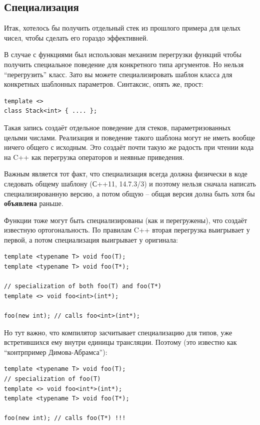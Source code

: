 \documentclass[a4paper,12pt,oneside]{book}
\begin{document}
\subsection{Специализация}\label{TemplateSpec}

Итак, хотелось бы получить отдельный стек из прошлого примера для целых чисел, чтобы сделать его гораздо эффективней.

В случае с функциями был использован механизм перегрузки функций чтобы получить специальное поведение для конкретного типа аргументов. Но нельзя ``перегрузить'' класс. Зато вы можете специализировать шаблон класса для конкретных шаблонных параметров. Синтаксис, опять же, прост:

\begin{lstlisting}
template <>
class Stack<int> { .... };
\end{lstlisting}

Такая запись создаёт отдельное поведение для стеков, параметризованных целыми числами. Реализация и поведение такого шаблона могут не иметь вообще ничего общего с исходным. Это создаёт почти такую же радость при чтении кода на C++ как перегрузка операторов и неявные приведения.

Важным является тот факт, что специализация всегда должна физически в коде следовать общему шаблону (С++11, 14.7.3/3) и поэтому нельзя сначала написать специализированную версию, а потом общую -- общая версия долна быть хотя бы \textbf{объявлена} раньше.

Функции тоже могут быть специализированы (как и перегружены), что создаёт известную ортогональность. По правилам C++ вторая перегрузка выигрывает у первой, а потом специализация выигрывает у оригинала:

\begin{lstlisting}
template <typename T> void foo(T);
template <typename T> void foo(T*); 

// specialization of both foo(T) and foo(T*)
template <> void foo<int>(int*); 

foo(new int); // calls foo<int>(int*);
\end{lstlisting}

Но тут важно, что компилятор засчитывает специализацию для типов, уже встретившихся ему внутри единицы трансляции. Поэтому (это известно как ``контрпример Димова-Абрамса''):

\begin{lstlisting}
template <typename T> void foo(T);
// specialization of foo(T)
template <> void foo<int*>(int*); 
template <typename T> void foo(T*);

foo(new int); // calls foo(T*) !!!
\end{lstlisting}
\end{document}
